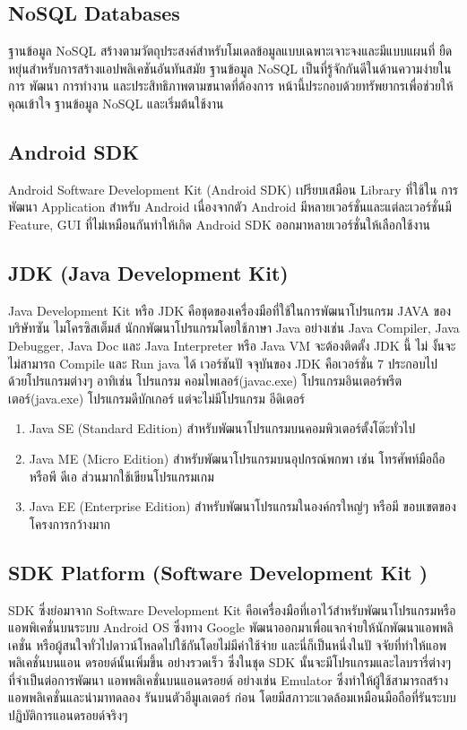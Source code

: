 \subsection{NoSQL Databases}
ฐานข้อมูล NoSQL \cite{nosql_is}  สร้างตามวัตถุประสงค์สําหรับโมเดลข้อมูลแบบเฉพาะเจาะจงและมีแบบแผนที่
ยืดหยุ่นสําหรับการสร้างแอปพลิเคชันอันทันสมัย ฐานข้อมูล NoSQL เป็นที่รู้จักกันดีในด้านความง่ายในการ
พัฒนา การทํางาน และประสิทธิภาพตามขนาดที่ต้องการ หน้านี้ประกอบด้วยทรัพยากรเพื่อช่วยให้คุณเข้าใจ
ฐานข้อมูล NoSQL และเริ่มต้นใช้งาน
\subsection{Android SDK}
Android Software Development Kit (Android SDK)\cite{sdk_tool}  เปรียบเสมือน Library ที่ใช้ใน
การพัฒนา Application สําหรับ Android เนื่องจากตัว Android มีหลายเวอร์ชั่นและแต่ละเวอร์ชั่นมี
Feature, GUI ที่ไม่เหมือนกันทําให้เกิด Android SDK ออกมาหลายเวอร์ชั่นให้เลือกใช้งาน

\subsection{JDK (Java Development Kit)}
Java Development Kit หรือ JDK \cite{android_studio} คือชุดของเครื่องมือที่ใช้ในการพัฒนาโปรแกรม JAVA ของ
บริษัทซัน ไมโครซิสเต็มส์ นักกพัฒนาโปรแกรมโดยใช้ภาษา Java อย่างเช่น Java Compiler, Java Debugger, Java Doc และ Java Interpreter หรือ Java VM จะต้องติดตั้ง JDK นี้ ไม่ งั้นจะไม่สามารถ
Compile และ Run java ได้ เวอร์ชันปั จจุบันของ JDK คือเวอร์ชั่น 7 ประกอบไป ด้วยโปรแกรมต่างๆ
อาทิเช่น โปรแกรม คอมไพเลอร์(javac.exe) โปรแกรมอินเตอร์พรีตเตอร์(java.exe) โปรแกรมดีบักเกอร์
แต่จะไม่มีโปรแกรม อีดิเตอร์
\begin{enumerate}
  \item  Java SE (Standard Edition) สําหรับพัฒนาโปรแกรมบนคอมพิวเตอร์ตั้งโต๊ะทั่วไป
  
  \item  Java ME (Micro Edition) สําหรับพัฒนาโปรแกรมบนอุปกรณ์พกพา เช่น โทรศัพท์มือถือหรือพี
  ดีเอ ส่วนมากใช้เขียนโปรแกรมเกม
  
  \item Java EE (Enterprise Edition) สําหรับพัฒนาโปรแกรมในองค์กรใหญ่ๆ หรือมี ขอบเขตของโครงการกว้างมาก
\end{enumerate}
\subsection{SDK Platform (Software Development Kit )}
SDK  ซึ่งย่อมาจาก Software Development Kit \cite{sdk_tool} คือเครื่องมือที่เอาไว้สําหรับพัฒนาโปรแกรมหรือ
แอพพิเคชั่นบนระบบ Android OS ซึ่งทาง Google พัฒนาออกมาเพื่อแจกจ่ายให้นักพัฒนาแอพพลิเคชั่น
หรือผู้สนใจทั่วไปดาวน์โหลดไปใช้กันโดยไม่มีค่าใช้จ่าย และนี่ก็เป็นหนึ่งในปั จจัยที่ทําให้แอพพลิเคชั่นบนแอน
ดรอยด์นั้นเพิ่มขึ้น อย่างรวดเร็ว ซึ่งในชุด SDK นั้นจะมีโปรแกรมและไลบรารี่ต่างๆ ที่จําเป็นต่อการพัฒนา
แอพพลิเคชั่นบนแอนดรอยด์ อย่างเช่น Emulator ซึ่งทําให้ผู้ใช้สามารถสร้างแอพพลิเคชั่นและนํามาทดลอง
รันบนตัวอีมูเลเตอร์ ก่อน โดยมีสภาวะแวดล้อมเหมือนมือถือที่รันระบบปฏิบัติการแอนดรอยด์จริงๆ
